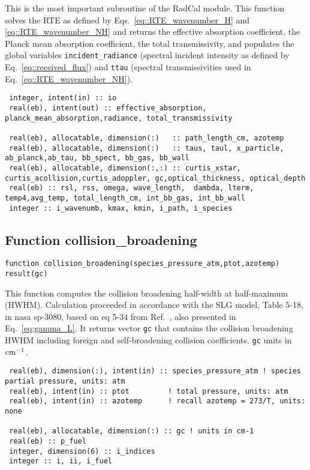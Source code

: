 This is the most important subroutine of the RadCal module. This function solves the RTE as defined by Eqs.~\ref{eq::RTE_wavenumber_H} and \ref{eq::RTE_wavenumber_NH} and returns the effective absorption coefficient, the Planck mean absorption coefficient, the total transmissivity, and populates the global variables \verb=incident_radiance= (spectral incident intensity as defined by Eq.~\ref{eq::received_flux}) and \verb=ttau= (spectral transmissivities used in Eq.~\ref{eq::RTE_wavenumber_NH}).

\begin{lstlisting}
 integer, intent(in) :: io
 real(eb), intent(out) :: effective_absorption, planck_mean_absorption,radiance, total_transmissivity

 real(eb), allocatable, dimension(:)   :: path_length_cm, azotemp
 real(eb), allocatable, dimension(:)   :: taus, taul, x_particle, ab_planck,ab_tau, bb_spect, bb_gas, bb_wall
 real(eb), allocatable, dimension(:,:) :: curtis_xstar, curtis_acollision,curtis_adoppler, gc,optical_thickness, optical_depth
 real(eb) :: rsl, rss, omega, wave_length,  dambda, lterm, temp4,avg_temp, total_length_cm, int_bb_gas, int_bb_wall
 integer :: i_wavenumb, kmax, kmin, i_path, i_species
\end{lstlisting}

\subsection{Function collision\_broadening}
\label{fun:collision_broadening}
\begin{lstlisting}
function collision_broadening(species_pressure_atm,ptot,azotemp) result(gc)
\end{lstlisting}
 This function computes the collision broadening half-width at half-maximum (HWHM). Calculation proceeded in accordance with the SLG model, Table 5-18, in nasa sp-3080, based on eq 5-34 from Ref.~\cite{Ludwig1973}, also presented in Eq.~\ref{eq:gamma_L}. It returns vector \verb=gc= that contains the collision broadening HWHM including foreign and self-broadening collision coefficients. \verb=gc= units in $\rm cm^{-1}$.

\begin{lstlisting}
 real(eb), dimension(:), intent(in) :: species_pressure_atm ! species partial pressure, units: atm
 real(eb), intent(in) :: ptot         ! total pressure, units: atm
 real(eb), intent(in) :: azotemp      ! recall azotemp = 273/T, units: none

 real(eb), allocatable, dimension(:) :: gc ! units in cm-1
 real(eb) :: p_fuel
 integer, dimension(6) :: i_indices
 integer :: i, ii, i_fuel
\end{lstlisting}



